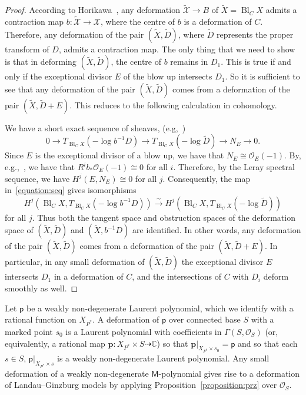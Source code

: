 \documentclass[10pt]{amsart}
\numberwithin{equation}{section}
\theoremstyle{plain}
\theoremstyle{definition}
\theoremstyle{remark}
\DeclareMathOperator{\Bl}{Bl}
\begin{document}
\begin{proof}
 According to Horikawa~\cite[Theorem 9.1]{horikawa1976deformations}, any deformation \(\widetilde{\mathscr{X}}\rightarrow B\) of \(\widetilde{X} = \Bl_CX\) admits a contraction map \(b \colon \widetilde{\mathscr{X}} \rightarrow \mathscr{X}\), where the centre of \(b\) is a deformation of \(C\). Therefore, any deformation of the pair \((\widetilde{X},\widetilde{D})\), where \(\widetilde{D}\) represents the proper transform of \(D\), admits a contraction map. The only thing that we need to show is that in deforming \((\widetilde{X},\widetilde{D})\), the centre of \(b\) remains in \(D_1\). This is true if and only if the exceptional divisor \(E\) of the blow up intersects \(D_1\). So it is sufficient to see that any deformation of the pair \((\widetilde{X},\widetilde{D})\) comes from a deformation of the pair \((\widetilde{X},\widetilde{D}+E)\). This reduces to the following calculation in cohomology.

  We have a short exact sequence of sheaves, (e.g,~\cite[Proposition 1]{kawamata1977deformations})
  \begin{equation}\label{equation:seq}
    0 \rightarrow T_{\Bl_CX}(-\log   b^{-1} D) \rightarrow T_{\Bl_CX}(-\log \widetilde{D} ) \rightarrow N_E  \rightarrow 0.
  \end{equation}
  Since \(E\) is the exceptional divisor of a blow up, we have that \(N_E \cong \mathcal{O}_E(-1)\). By, e.g.,~\cite[III Exercise 8.4]{hartshorne2013algebraic}, we have that \(R^ib_*\mathcal{O}_E(-1) \cong 0\) for all \(i\). Therefore, by the Leray spectral sequence, we have \(H^j(E,N_E) \cong 0\) for all \(j\). Consequently, the map in~\eqref{equation:seq} gives isomorphisms
  \[
    H^j(\Bl_CX,T_{\Bl_{C}X} (-\log  b^{-1}D )) \xrightarrow{\sim} H^j(\Bl_CX,T_{\Bl_CX}(-\log  \widetilde{D}))
  \]
  for all \(j\). Thus both the tangent space and obstruction spaces of the deformation space of \((\widetilde{X},\widetilde{D})\) and \((\widetilde{X},b^{-1}D)\) are identified. In other words, any deformation of the pair \((\widetilde{X},\widetilde{D})\) comes from a deformation of the pair \((\widetilde{X},\widetilde{D} + E)\). In particular, in any small deformation of \((\widetilde{X},\widetilde{D})\) the exceptional divisor \(E\) intersects \(D_1\) in a deformation of \(C\), and the intersections of \(C\) with \(D_i\) deform smoothly as well.
\end{proof}

Let \(\mathsf{p}\) be a weakly non-degenerate Laurent polynomial, which we identify with a rational function on \(X_{P^*}\). A deformation of \(\mathsf{p}\) over connected base \(S\) with a marked point \(s_0\) is a Laurent polynomial with coefficients in \(\Gamma(S,\mathcal{O}_S)\) (or, equivalently, a rational map \({\bm p} \colon X_{P^*}\times S\dashrightarrow \mathbb{C}\)) so that \({\bm p}|_{X_{P^*} \times s_0} = \mathsf{p}\) and so that each \(s\in S\), \(\mathsf{p}|_{X_{P^*}\times s}\) is a weakly non-degenerate Laurent polynomial. Any small deformation of a weakly non-degenerate \(\mathsf{M}\)-polynomial gives rise to a deformation of Landau--Ginzburg models by applying Proposition~\ref{proposition:prz} over \(\mathcal{O}_S\).
\end{document}
